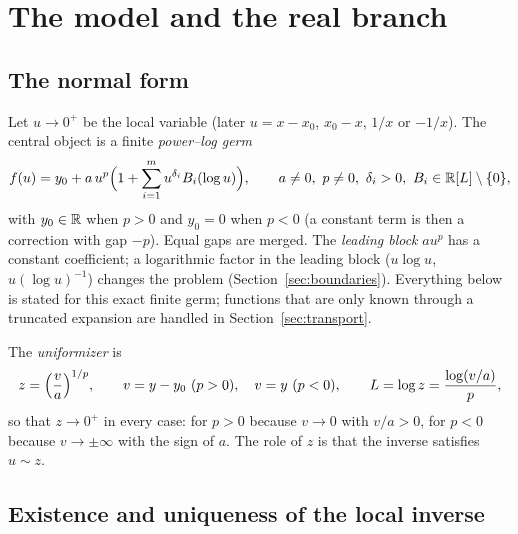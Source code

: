 \section{The model and the real branch}
\label{sec:branch}

\subsection{The normal form}

Let $u\to0^+$ be the local variable (later $u=x-x_0$, $x_0-x$, $1/x$ or $-1/x$). The central object is a finite \emph{power--log germ}
\begin{equation}
 f(u)=y_0+a\,u^p\Bigl(1+\sum_{i=1}^m u^{\delta_i}B_i(\log u)\Bigr),\qquad
 a\ne0,\ p\ne0,\ \delta_i>0,\ B_i\in\mathbb R[L]\setminus\{0\},
 \label{eq:model}
\end{equation}
with $y_0\in\mathbb R$ when $p>0$ and $y_0=0$ when $p<0$ (a constant term is then a correction with gap $-p$). Equal gaps are merged. The \emph{leading block} $au^p$ has a constant coefficient; a logarithmic factor in the leading block ($u\log u$, $u(\log u)^{-1}$) changes the problem (Section~\ref{sec:boundaries}). Everything below is stated for this exact finite germ; functions that are only known through a truncated expansion are handled in Section~\ref{sec:transport}.

The \emph{uniformizer} is
\begin{equation}
 z=\Bigl(\frac{v}{a}\Bigr)^{1/p},\qquad v=y-y_0\ (p>0),\quad v=y\ (p<0),\qquad L=\log z=\frac{\log(v/a)}{p},
 \label{eq:uniformizer}
\end{equation}
so that $z\to0^+$ in every case: for $p>0$ because $v\to0$ with $v/a>0$, for $p<0$ because $v\to\pm\infty$ with the sign of $a$. The role of $z$ is that the inverse satisfies $u\sim z$.

\subsection{Existence and uniqueness of the local inverse}

